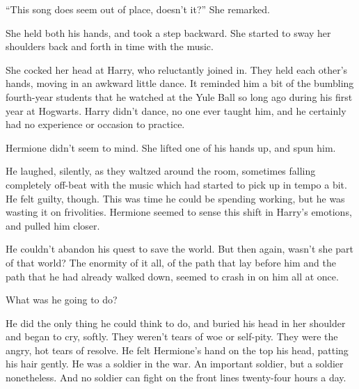 “This song does seem out of place, doesn’t it?” She remarked.


She held both his hands, and took a step backward. She started to sway her shoulders back and forth in time with the music.


She cocked her head at Harry, who reluctantly joined in. They held each other’s hands, moving in an awkward little dance. It reminded him a bit of the bumbling fourth-year students that he watched at the Yule Ball so long ago during his first year at Hogwarts. Harry didn’t dance, no one ever taught him, and he certainly had no experience or occasion to practice.

Hermione didn’t seem to mind. She lifted one of his hands up, and spun him.


He laughed, silently, as they waltzed around the room, sometimes falling completely off-beat with the music which had started to pick up in tempo a bit. He felt guilty, though. This was time he could be spending working, but he was wasting it on frivolities. Hermione seemed to sense this shift in Harry’s emotions, and pulled him closer.


He couldn’t abandon his quest to save the world. But then again, wasn’t she part of that world? The enormity of it all, of the path that lay before him and the path that he had already walked down, seemed to crash in on him all at once.

What was he going to do?

He did the only thing he could think to do, and buried his head in her shoulder and began to cry, softly. They weren’t tears of woe or self-pity. They were the angry, hot tears of resolve. He felt Hermione’s hand on the top his head, patting his hair gently. He was a soldier in the war. An important soldier, but a soldier nonetheless. And no soldier can fight on the front lines twenty-four hours a day.

